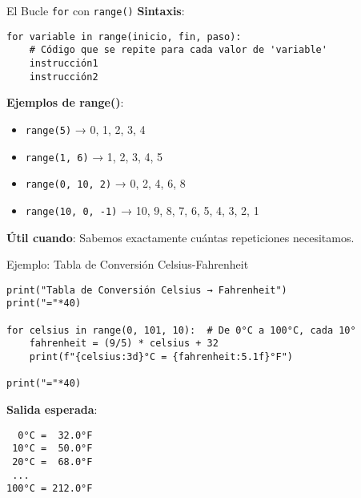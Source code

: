 \documentclass[10pt]{beamer}
\begin{document}
\begin{frame}[fragile]{El Bucle \texttt{for} con \texttt{range()}}
  \textbf{Sintaxis}:
  \begin{verbatim}
for variable in range(inicio, fin, paso):
    # Código que se repite para cada valor de 'variable'
    instrucción1
    instrucción2
  \end{verbatim}
  
  \textbf{Ejemplos de range()}:
  \begin{itemize}
    \item \texttt{range(5)} → 0, 1, 2, 3, 4
    \item \texttt{range(1, 6)} → 1, 2, 3, 4, 5
    \item \texttt{range(0, 10, 2)} → 0, 2, 4, 6, 8
    \item \texttt{range(10, 0, -1)} → 10, 9, 8, 7, 6, 5, 4, 3, 2, 1
  \end{itemize}
  
  \textbf{Útil cuando}: Sabemos exactamente cuántas repeticiones necesitamos.
\end{frame}

\begin{frame}[fragile]{Ejemplo: Tabla de Conversión Celsius-Fahrenheit}
\begin{verbatim}
print("Tabla de Conversión Celsius → Fahrenheit")
print("="*40)

for celsius in range(0, 101, 10):  # De 0°C a 100°C, cada 10°
    fahrenheit = (9/5) * celsius + 32
    print(f"{celsius:3d}°C = {fahrenheit:5.1f}°F")

print("="*40)
\end{verbatim}

\textbf{Salida esperada}:
\begin{verbatim}
  0°C =  32.0°F
 10°C =  50.0°F
 20°C =  68.0°F
 ...
100°C = 212.0°F
\end{verbatim}
\end{frame}


\end{document}
